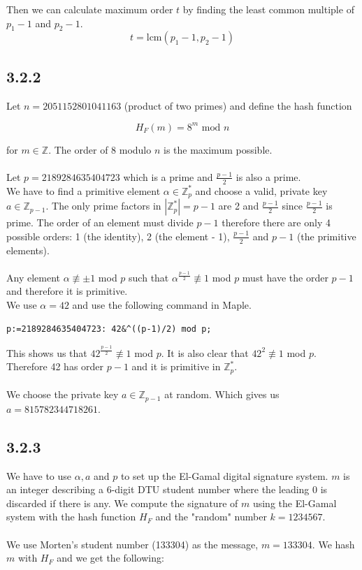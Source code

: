 \documentclass[11pt]{report}
\begin{document}
Then we can calculate maximum order $t$ by finding the least common multiple of $p_1-1$ and $p_2-1$.
$$t = \text{lcm}(p_1-1, p_2 -1)$$


\subsection*{3.2.2}
Let $n = 2051152801041163$ (product of two primes) and define the hash function

$$H_F(m) = 8^m \text{ mod } n$$

for $m \in \mathbb{Z}$. The order of 8 modulo $n$ is the maximum possible.\\
\\
Let $p = 2189284635404723$ which is a prime and $\frac{p-1}{2}$ is also a prime.\\
We have to find a primitive element $\alpha \in \mathbb{Z}^*_p$ and choose a valid, private key $a \in \mathbb{Z}_{p-1}$.
The only prime factors in $|\mathbb{Z}^*_p| = p - 1$ are 2 and $\frac{p-1}{2}$ since $\frac{p-1}{2}$ is prime. The order of an element must divide $p - 1$ therefore there are only 4 possible orders: 1 (the identity), 2 (the element - 1), $\frac{p-1}{2}$ and $p - 1$ (the primitive elements).\\
\\
Any element $\alpha \not\equiv \pm 1$ mod $p$ such that $\alpha^{\frac{p-1}{2}} \not\equiv 1$ mod $p$ must have the order $p - 1$ and therefore it is primitive.\\
We use $\alpha = 42$ and use the following command in Maple.
\begin{lstlisting}[style=Maple]
p:=2189284635404723: 42&^((p-1)/2) mod p;
\end{lstlisting}
This shows us that $42^{\frac{p-1}{2}} \not\equiv 1$ mod $p$. It is also clear that $42^2 \not\equiv 1$ mod $p$. Therefore 42 has order $p - 1$ and it is primitive in $\mathbb{Z}^*_p$.\\
\\
We choose the private key $a \in \mathbb{Z}_{p-1}$ at random. Which gives us $a = 815782344718261$.

\subsection*{3.2.3}
We have to use $\alpha, a$ and $p$ to set up the El-Gamal digital signature system. $m$ is an integer describing a 6-digit DTU student number where the leading 0 is discarded if there is any. We compute the signature of $m$ using the El-Gamal system with the hash function $H_F$ and the "random" number $k = 1234567$.\\
\\
We use Morten's student number (133304) as the message, $m = 133304$. We hash $m$ with $H_F$ and we get the following:
\end{document}
